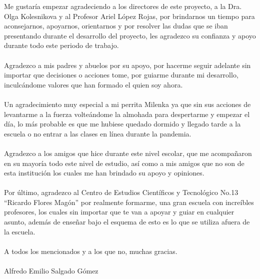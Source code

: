 \documentclass[12pt, a4paper, titlepage]{report}
\begin{document}
\newpage
Me gustaría empezar agradeciendo a los directores de este proyecto, a la Dra. Olga Kolesnikova y al Profesor Ariel López Rojas, por brindarnos un tiempo para aconsejarnos, apoyarnos, orientarnos y por resolver las dudas que se iban presentando durante el desarrollo del proyecto, les agradezco su confianza y apoyo durante todo este periodo de trabajo.\\\\
Agradezco a mis padres y abuelos por su apoyo, por hacerme seguir adelante sin importar que decisiones o acciones tome, por guiarme durante mi desarrollo, inculcándome valores que han formado el quien soy ahora.\\\\
Un agradecimiento muy especial a mi perrita Milenka ya que sin sus acciones de levantarme a la fuerza volteándome la almohada para despertarme y empezar el día, lo más probable es que me hubiese quedado dormido y llegado tarde a la escuela o no entrar a las clases en línea durante la pandemia.\\\\
Agradezco a los amigos que hice durante este nivel escolar, que me acompañaron en su mayoría todo este nivel de estudio, así como a mis amigos que no son de esta institución los cuales me han brindado su apoyo y opiniones.\\\\
Por último, agradezco al Centro de Estudios Científicos y Tecnológico No.13 “Ricardo Flores Magón” por realmente formarme, una gran escuela con increíbles profesores, los cuales sin importar que te van a apoyar y guiar en cualquier asunto, además de enseñar bajo el esquema de esto es lo que se utiliza afuera de la escuela.\\\\
A todos los mencionados y a los que no, muchas gracias.\\\\

Alfredo Emilio Salgado Gómez
\end{document}

